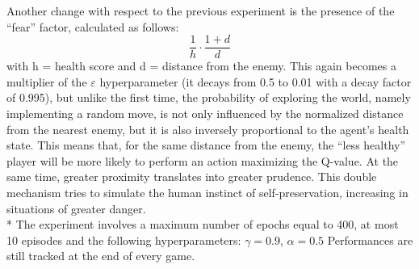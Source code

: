 Another change with respect to the previous experiment is the presence of the ``fear'' factor, calculated as follows:
$$\frac{1}{h}\cdot\frac{1+d}{d}$$
with h = health score and d = distance from the enemy.
This again becomes a multiplier of the $\varepsilon$ hyperparameter (it decays from 0.5 to 0.01 with a decay factor of 0.995), but unlike the first time, the probability of exploring the world, namely implementing a random move, is not only influenced by the normalized distance from the nearest enemy, but it is also inversely proportional to the agent's health state. 
This means that, for the same distance from the enemy, the ``less healthy'' player will be more likely to perform an action maximizing the Q-value. At the same time, greater  proximity translates into greater prudence. 
This double mechanism tries to simulate the human instinct of self-preservation, increasing in situations of greater danger.\\*
The experiment involves a maximum number of epochs equal to 400,
at most 10 episodes and the following hyperparameters: $\gamma = 0.9$, $\alpha = 0.5$
Performances are still tracked at the end of every game.

